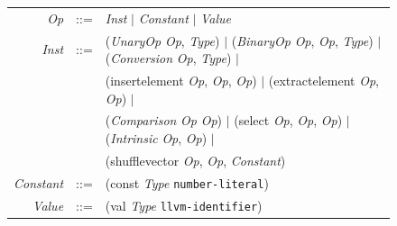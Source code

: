\begin{figure}[tbp]
  \begin{tabular}{r c l}
    \emph{Op} &::=& \emph{Inst} $\vert$ \emph{Constant} $\vert$ \emph{Value} \\
    \emph{Inst}  &::=& (\emph{UnaryOp} \emph{Op}, \emph{Type}) $\vert$ (\emph{BinaryOp} \emph{Op}, \emph{Op}, \emph{Type}) $\vert$ (\emph{Conversion} \emph{Op}, \emph{Type}) $\vert$\\
              && (insertelement \emph{Op}, \emph{Op}, \emph{Op}) $\vert$ (extractelement \emph{Op}, \emph{Op})  $\vert$\\
              && (\emph{Comparison} \emph{Op} \emph{Op}) $\vert$ (select \emph{Op}, \emph{Op}, \emph{Op}) $\vert$ (\emph{Intrinsic} \emph{Op}, \emph{Op}) $\vert$ \\
              && (shufflevector \emph{Op}, \emph{Op}, \emph{Constant}) \\
    \emph{Constant} &::=& (const \emph{Type} \texttt{number-literal}) \\
    \emph{Value} &::=& (val \emph{Type} \texttt{llvm-identifier}) \\


\end{tabular}
\end{figure}
